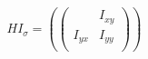 $$
HI_{\sigma} = (
\left(
  \begin{array}{cc}
     & I_{xy}\\
    I_{yx} & I_{yy} \\
  \end{array}
\right)
)
$$